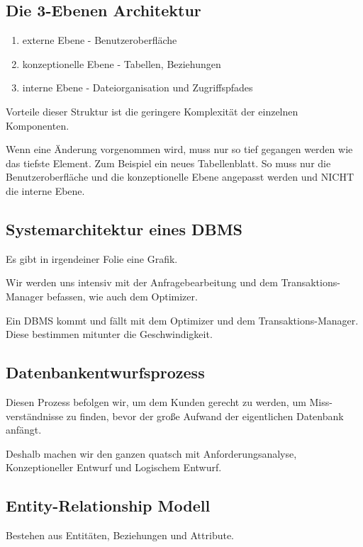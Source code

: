 \documentclass[a4paper]{article}
\begin{document}
\subsection{Die 3-Ebenen Architektur}

\begin{enumerate}
    \item externe Ebene - Benutzeroberfläche
    \item konzeptionelle Ebene - Tabellen, Beziehungen
    \item interne Ebene - Dateiorganisation und Zugriffspfades
\end{enumerate}

Vorteile dieser Struktur ist die geringere Komplexität der einzelnen Komponenten. 

Wenn eine Änderung vorgenommen wird, muss nur so tief gegangen werden wie das tiefste Element. Zum Beispiel ein neues Tabellenblatt. So muss nur die Benutzeroberfläche und die konzeptionelle Ebene angepasst werden und NICHT die interne Ebene.

\subsection{Systemarchitektur eines DBMS}

Es gibt in irgendeiner Folie eine Grafik.

Wir werden uns intensiv mit der Anfragebearbeitung und dem Transaktions-Manager befassen, wie auch dem Optimizer.

Ein DBMS kommt und fällt mit dem Optimizer und dem Transaktions-Manager. Diese bestimmen mitunter die Geschwindigkeit.

\subsection{Datenbankentwurfsprozess}

Diesen Prozess befolgen wir, um dem Kunden gerecht zu werden, um Miss-verständnisse zu finden, bevor der große Aufwand der eigentlichen Datenbank anfängt.

Deshalb machen wir den ganzen quatsch mit Anforderungsanalyse, Konzeptioneller Entwurf und Logischem Entwurf.

\subsection{Entity-Relationship Modell}

Bestehen aus Entitäten, Beziehungen und Attribute.
\end{document}
